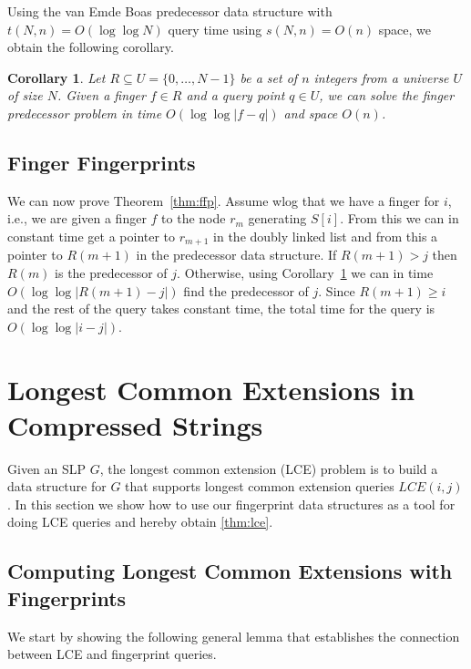 \documentclass[11pt]{article}
\newtheorem{corollary}{Corollary}
\newcommand{\slp}{\ensuremath{G} }
\begin{document}
\noindent Using the van Emde Boas predecessor data structure \cite{van1976design, mehlhorn1990bounded, willard1983log} with $t(N, n) = O(\log \log N)$ query time using $s(N, n) = O(n)$ space, we obtain the following corollary.

\begin{corollary}\label{cor:fingerpred}
	Let $R \subseteq U = \{ 0, \ldots, N-1 \}$ be a set of $n$ integers from a universe $U$ of size $N$. 
	Given a finger $f \in R$ and a query point $q \in U$, we can solve the finger predecessor problem in time $O(\log \log |f - q|)$ and space $O(n)$.\end{corollary}

\subsection{Finger Fingerprints}
We can now prove Theorem~\ref{thm:ffp}. Assume wlog that we have a finger for $i$, i.e., we  are given a finger $f$ to the node $r_m$ generating $S[i]$. From this we can in constant time get a pointer to $r_{m+1}$ in the doubly linked list and from this a pointer to $R(m+1)$ in the predecessor data structure. If $R(m+1) > j$ then $R(m)$ is the predecessor of $j$. Otherwise,  using Corollary~\ref{cor:fingerpred} we can in time $O(\log\log |R(m+1)-j|)$ find the predecessor of $j$. Since $R(m+1) \geq i$ and the rest of the query takes constant time, the total time for the query is $O(\log \log |i-j|)$.




\section{Longest Common Extensions in Compressed Strings}
Given an SLP $\slp$, the longest common extension (LCE) problem is to build a data structure for $\slp$ that supports longest common extension queries $LCE(i,j)$. In this section we show how to use our fingerprint data structures as a tool for doing LCE queries and hereby obtain \autoref{thm:lce}.



\subsection{Computing Longest Common Extensions with Fingerprints}


We start by showing the following general lemma that establishes the connection between LCE and fingerprint queries.
\end{document}
